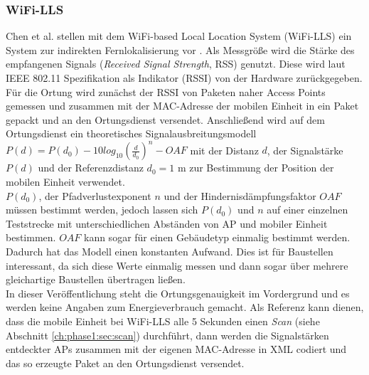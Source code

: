 \subsubsection{WiFi-LLS}
\label{ch:Vorherige:sec:LLS}
Chen et al. stellen mit dem WiFi-based Local Location System (WiFi-LLS) ein System zur indirekten Fernlokalisierung vor \cite{chen2007design}.
Als Messgröße wird die Stärke des empfangenen Signals (\emph{Received Signal Strength}, RSS) genutzt. 
Diese wird laut IEEE 802.11 Spezifikation als Indikator (RSSI) von der Hardware zurückgegeben. \\
Für die Ortung wird zunächst der RSSI von Paketen naher Access Points gemessen und zusammen mit der MAC-Adresse der mobilen Einheit in ein Paket gepackt und an den Ortungsdienst versendet.
Anschließend wird auf dem Ortungsdienst ein theoretisches Signalausbreitungsmodell $P(d) = P(d_0) - 10log_{10}(\frac{d}{d_0})^n - OAF$ mit der Distanz $d$, der Signalstärke $P(d)$ und der Referenzdistanz $d_0 = 1$ m zur Bestimmung der Position der mobilen Einheit verwendet. \\
$P(d_0)$, der Pfadverlustexponent $n$ und der Hindernisdämpfungsfaktor $OAF$ müssen bestimmt werden, jedoch lassen sich $P(d_0)$ und $n$ auf einer einzelnen Teststrecke mit unterschiedlichen Abständen von AP und mobiler Einheit bestimmen. $OAF$ kann sogar für einen Gebäudetyp einmalig bestimmt werden.
Dadurch hat das Modell einen konstanten Aufwand. 
Dies ist für Baustellen interessant, da sich diese Werte einmalig messen und dann sogar über mehrere gleichartige Baustellen übertragen ließen.\\
In dieser Veröffentlichung steht die Ortungsgenauigkeit im Vordergrund und es werden keine Angaben zum Energieverbrauch gemacht. 
Als Referenz kann dienen, dass die mobile Einheit bei WiFi-LLS alle 5 Sekunden einen \emph{Scan} (siehe Abschnitt \ref{ch:phase1:sec:scan}) durchführt, dann werden die Signalstärken entdeckter APs zusammen mit der eigenen MAC-Adresse in XML codiert und das so erzeugte Paket an den Ortungsdienst versendet.


